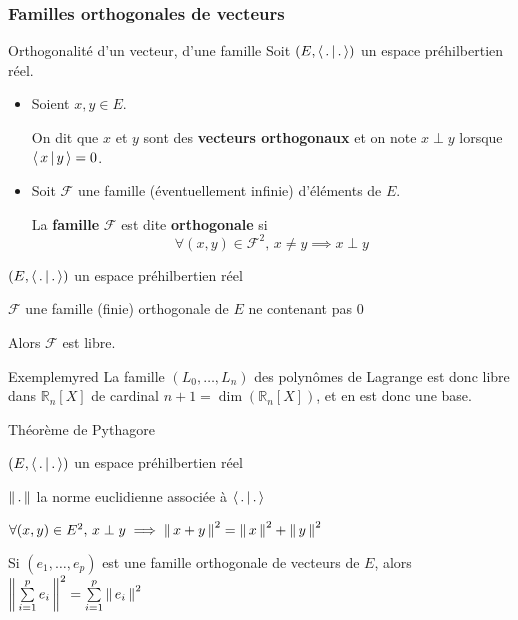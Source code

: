         \subsubsection{Familles orthogonales de vecteurs}

        \begin{defi}{Orthogonalité d’un vecteur, d’une famille}{}
            Soit $(E, \left<\,.\,\middle|\,.\,\right>)$ un espace préhilbertien réel.
            \begin{itemize}
                \item Soient $x,y \in E$. 
        
                On dit que $x$ et $y$ sont des \textbf{vecteurs orthogonaux} et on note $x \perp y$ lorsque $\left<\,x\,\middle|\,y\,\right> = 0$.
                \item Soit $\mathcal{F}$ une famille (éventuellement infinie) d’éléments de $E$.
        
                La \textbf{famille} $\mathcal{F}$ est dite \textbf{orthogonale} si \[ \forall (x,y) \in \mathcal{F}^2, \, x \neq y \implies x \perp y \]
            \end{itemize}
        \end{defi}

        \begin{theo}{}{}
            \begin{soient}
                \item $(E,\left<\,.\,\middle|\,.\,\right>)$ un espace préhilbertien réel
                \item $\mathcal{F}$ une famille (finie) orthogonale de $E$ ne contenant pas $0$
            \end{soient}
            Alors $\mathcal{F}$ est libre.
        \end{theo}
    
        \begin{omed}{Exemple}{myred}
            La famille $(L_0,\ldots,L_n)$ des polynômes de Lagrange est donc libre dans $\mathbb{R}_n[X]$ de cardinal $n+1 = \dim(\mathbb{R}_n[X])$, et en est donc une base.
        \end{omed}

        \begin{theo}{Théorème de Pythagore}{}
            \begin{soient}
                \item $(E,\left<\,.\,\middle|\,.\,\right>)$ un espace préhilbertien réel
                \item $\left\lVert \,. \, \right\rVert$ la norme euclidienne associée à $\left<\,.\,\middle|\,.\,\right>$
            \end{soient}
            \begin{alors}
                \item $\forall (x,y) \in E^2, \, x \perp y \implies \left\lVert \,x + y \, \right\rVert^2 = \left\lVert \,x \, \right\rVert^2 + \left\lVert \,y \, \right\rVert^2$
                \item Si $(e_1,\ldots,e_p)$ est une famille orthogonale de vecteurs de $E$, alors $ \left\lVert \,\sum\limits_{i=1}^p e_i \, \right\rVert^2 = \sum\limits_{i=1}^p \left\lVert \,e_i \, \right\rVert^2 $
            \end{alors}
        \end{theo}
    

